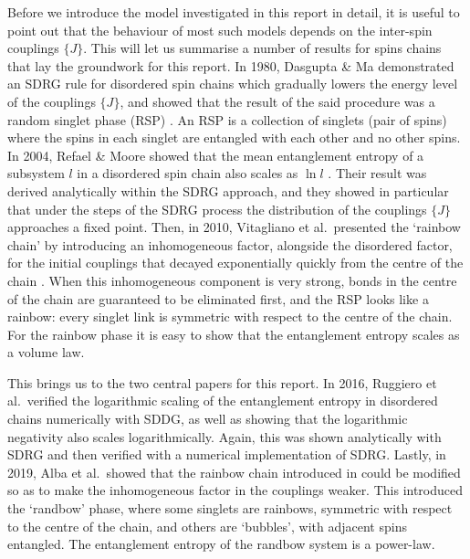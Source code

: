 Before we introduce the model investigated in this report in detail, it is useful to point out  that the behaviour of most such models depends on the inter-spin couplings $\{J\}$. This will let us summarise a number of results for spins chains that lay the groundwork for this report. In 1980, Dasgupta \& Ma demonstrated an SDRG rule for disordered spin chains which gradually lowers the energy level of the couplings $\{J\}$, and showed that the result of the said procedure was a random singlet phase (RSP) \cite{dasgupta_ma_1980}. An RSP is a collection of singlets (pair of spins) where the spins in each singlet are entangled with each other and no other spins. In 2004, Refael \& Moore showed that the mean entanglement entropy of a subsystem $l$ in a disordered spin chain also scales as $\ln l$ \cite{refael2004}. Their result was derived analytically within the SDRG approach, and they showed in particular that under the steps of the SDRG process the distribution of the couplings $\{J\}$ approaches a fixed point. Then, in 2010, Vitagliano et al.\ presented the `rainbow chain' by introducing an inhomogeneous factor, alongside the disordered factor, for the initial couplings that decayed exponentially quickly from the centre of the chain \cite{Vitagliano2010}. When this inhomogeneous component is very strong, bonds in the centre of the chain are guaranteed to be eliminated first, and the RSP looks like a rainbow: every singlet link is symmetric with respect to the centre of the chain. For the rainbow phase it is easy to show that the entanglement entropy scales as a volume law.

This brings us to the two central papers for this report. In 2016, Ruggiero et al.\ verified the logarithmic scaling of the entanglement entropy in disordered chains numerically with SDDG, as well as showing that the logarithmic negativity also scales logarithmically. Again, this was shown analytically with SDRG and then verified with a numerical implementation of SDRG. Lastly, in 2019, Alba et al.\ showed that the rainbow chain introduced in \cite{Vitagliano2010} could be modified so as to make the inhomogeneous factor in the couplings weaker. This introduced the `randbow' phase, where some singlets are rainbows, symmetric with respect to the centre of the chain, and others are `bubbles', with adjacent spins entangled. The entanglement entropy of the randbow system is a power-law. 


